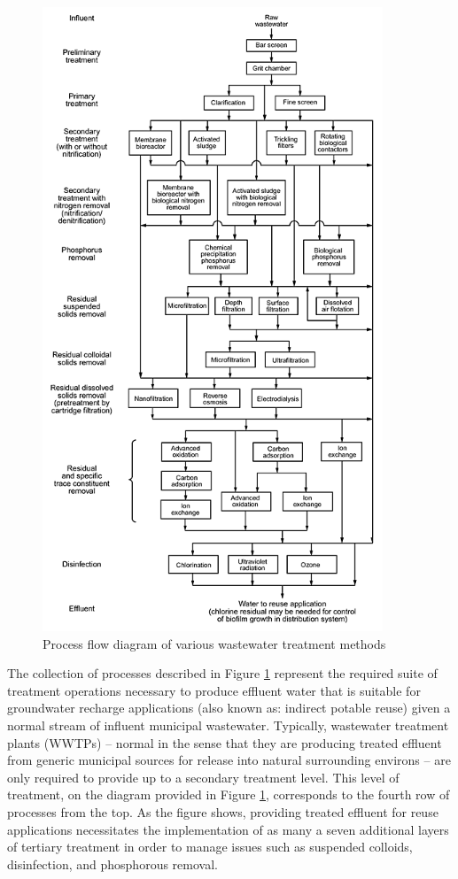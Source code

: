     \begin{figure}[!h]
       \centering
       \includegraphics[width=4in]{figures/process-flow.png}
       \caption[Process Flow Diagram of Wastewater Treatment Methods]{Process flow diagram of various wastewater treatment methods \cite{Asano2007}}
       \label{fig:process-flow-diagram}
     \end{figure}

The collection of processes described in Figure \ref{fig:process-flow-diagram} represent the required suite of treatment operations necessary to produce effluent water that is suitable for groundwater recharge applications (also known as: indirect potable reuse) given a normal stream of influent municipal wastewater. Typically, wastewater treatment plants (WWTPs) -- normal in the sense that they are producing treated effluent from generic municipal sources for release into natural surrounding environs -- are only required to provide up to a secondary treatment level. This level of treatment, on the diagram provided in Figure \ref{fig:process-flow-diagram}, corresponds to the fourth row of processes from the top. As the figure shows, providing treated effluent for reuse applications necessitates the implementation of as many a seven additional layers of tertiary treatment in order to manage issues such as suspended colloids, disinfection, and phosphorous removal.

